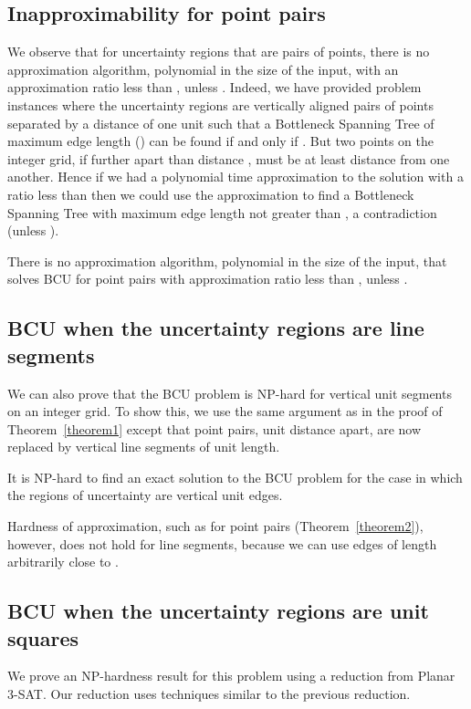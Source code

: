 \subsection{Inapproximability for point pairs}
\label{subsec:best}
We observe that for uncertainty regions that are pairs of points,
there is no approximation algorithm, polynomial in the size of the
input, with an approximation ratio less than , unless
.  Indeed, we have provided problem instances where the
uncertainty regions are vertically aligned pairs of points separated
by a distance of one unit such that a Bottleneck Spanning Tree of
maximum edge length  () can be found if and only if
.  But two points on the integer grid, if further apart than
distance , must be at least distance  from one another.
Hence if we had a polynomial time approximation to the solution with a
ratio less than  then we could use the approximation to
find a Bottleneck Spanning Tree with maximum edge length not greater
than , a contradiction (unless ).

\begin{theorem} \label{theorem2}
There  is no approximation algorithm, polynomial in the size of the input, that solves BCU for point pairs with approximation ratio  less than , unless .
\end{theorem}





\subsection{BCU when the uncertainty regions are line segments}
\label{subsec:line}
We can also prove that the BCU problem is NP-hard for vertical unit segments on an integer grid.  To show this,  we use the same argument as in the proof of Theorem~\ref{theorem1} except that point pairs, unit distance apart, are now replaced by vertical line segments of unit length.

\begin{theorem} \label{theorem3}
It is NP-hard to find an exact solution to the BCU problem for the case in which the regions of uncertainty are vertical unit edges.
\end{theorem}

\noindent Hardness of approximation, such as for point pairs (Theorem~\ref{theorem2}), however, does not hold for line segments, because we can use edges of length arbitrarily close to .


\subsection{BCU when the uncertainty regions are unit squares}
We prove an NP-hardness result for this problem using a reduction from
Planar 3-SAT. Our reduction uses techniques similar to the previous
reduction.


